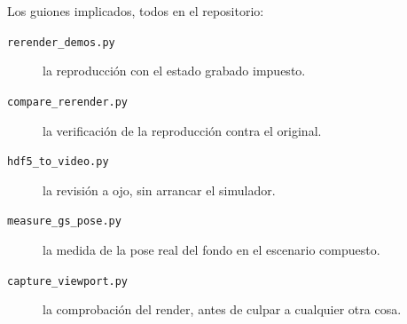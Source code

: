 Los guiones implicados, todos en el repositorio:

\begin{description}
	\item[\texttt{rerender\_demos.py}] la reproducción con el estado grabado impuesto.
	\item[\texttt{compare\_rerender.py}] la verificación de la reproducción contra el original.
	\item[\texttt{hdf5\_to\_video.py}] la revisión a ojo, sin arrancar el simulador.
	\item[\texttt{measure\_gs\_pose.py}] la medida de la pose real del fondo en el escenario compuesto.
	\item[\texttt{capture\_viewport.py}] la comprobación del render, antes de culpar a cualquier otra cosa.
\end{description}
